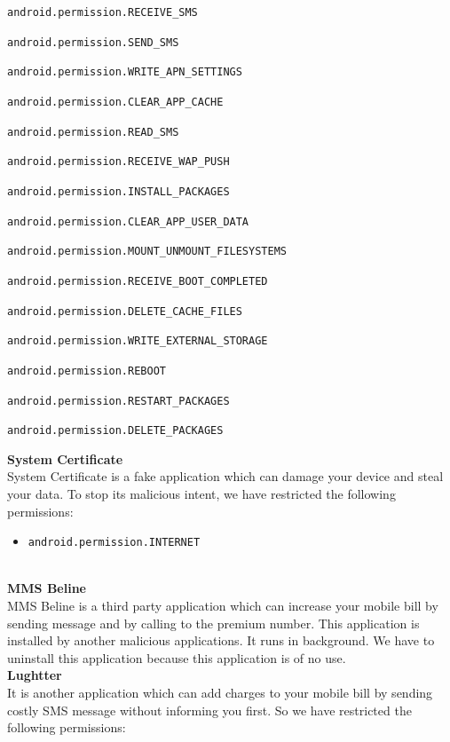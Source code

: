 \begin{itemize}
\begin{spacing}{0.9}
\item \texttt{android.permission.RECEIVE\_SMS}
\item \texttt{android.permission.SEND\_SMS}
\item \texttt{android.permission.WRITE\_APN\_SETTINGS}
\item \texttt{android.permission.CLEAR\_APP\_CACHE}
\item \texttt{android.permission.READ\_SMS}
\item \texttt{android.permission.RECEIVE\_WAP\_PUSH}
\item \texttt{android.permission.INSTALL\_PACKAGES}
\item \texttt{android.permission.CLEAR\_APP\_USER\_DATA}
\item \texttt{android.permission.MOUNT\_UNMOUNT\_FILESYSTEMS}
\item \texttt{android.permission.RECEIVE\_BOOT\_COMPLETED}
\item \texttt{android.permission.DELETE\_CACHE\_FILES}
\item \texttt{android.permission.WRITE\_EXTERNAL\_STORAGE}
\item \texttt{android.permission.REBOOT}
\item \texttt{android.permission.RESTART\_PACKAGES}
\item \texttt{android.permission.DELETE\_PACKAGES}
\end{spacing}
\end{itemize}
{\Large \textbf{System Certificate}}\\
System Certificate  is a fake application which can damage your device and steal your data. To stop its malicious intent, we have restricted the following permissions:
\begin{itemize}
    \item \texttt{android.permission.INTERNET}
\end{itemize}\\
{\Large \textbf{MMS Beline}}\\
MMS Beline is a third party application which can increase your mobile bill by sending message and by calling to the premium number. This application is installed by another malicious applications. It runs in background. We have to uninstall this application because this application is of no use.\\
{\Large \textbf{Lughtter}}\\
It is another application which can add charges to your mobile bill by sending costly SMS message without informing you first. So we have restricted the following permissions:


